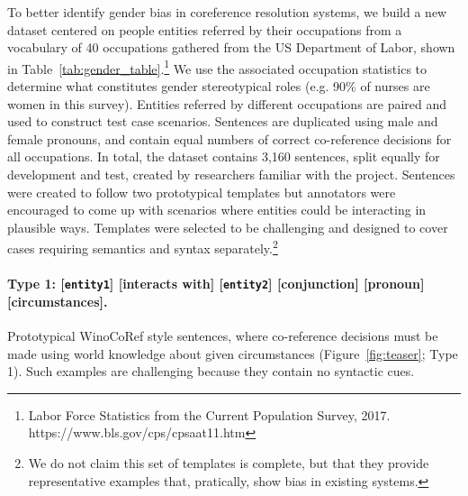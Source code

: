 

To better identify gender bias in coreference resolution systems, we build a new dataset centered on people entities referred by their occupations from a vocabulary of 40 occupations gathered from the US Department of Labor, shown in Table~\ref{tab:gender_table}.\footnote{Labor Force Statistics from the Current Population Survey, 2017. https://www.bls.gov/cps/cpsaat11.htm} 
We use the associated occupation statistics to determine what constitutes gender stereotypical roles (e.g. 90\% of nurses are women in this survey). 
Entities referred by different occupations are paired and used to construct test case scenarios.
Sentences are duplicated using male and female pronouns, and contain equal numbers of correct co-reference decisions for all occupations.
In total, the dataset contains 3,160 sentences, split equally for development and test, created by researchers  familiar with the project.
Sentences were created to follow two prototypical templates but annotators were encouraged to come up with scenarios where entities could be interacting in plausible ways. %
Templates were selected to be challenging and designed to cover cases requiring semantics and syntax separately.\footnote{We do not claim this set of templates is complete, but that they provide representative examples that, pratically, show bias in existing systems.} 


\paragraph{Type 1: [\texttt{entity1}] [interacts with]   [\texttt{entity2}] [conjunction] [pronoun] [circumstances].} Prototypical WinoCoRef style sentences, where co-reference decisions must be made using world knowledge about given circumstances (Figure~\ref{fig:teaser}; Type 1).
Such examples are challenging because they contain no syntactic cues.

